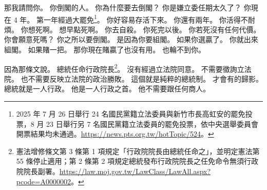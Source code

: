 \hypertarget{w01:cue:2413}{}那我請問你。
\hypertarget{w01:cue:2414}{}你倒閣的人。
\hypertarget{w01:cue:2415}{}你為什麼要去倒閣？
\hypertarget{w01:cue:2416}{}你是嫌立委任期太久了？
\hypertarget{w01:cue:2417}{}你現在 4 年。
\hypertarget{w01:cue:2418}{}第一年經過大罷免\footnote{2025 年 7 月 26 日舉行 24 名國民黨籍立法委員與新竹市長高虹安的罷免投票，8 月 23 日舉行另 7 名國民黨籍立法委員的罷免投票，依中央選舉委員會開票結果均未通過。\url{https://news.pts.org.tw/hotTopic/524}。}。
\hypertarget{w01:cue:2419}{}你好容易存活下來。
\hypertarget{w01:cue:2420}{}你還有兩年。
\hypertarget{w01:cue:2421}{}你活得不耐煩。
\hypertarget{w01:cue:2422}{}你想死啊。
\hypertarget{w01:cue:2423}{}想早點死啊。
\hypertarget{w01:cue:2424}{}你去自殺。
\hypertarget{w01:cue:2425}{}你死完以後。
\hypertarget{w01:cue:2426}{}你若死沒有任何代價。
\hypertarget{w01:cue:2427}{}你會願意死嗎？
\hypertarget{w01:cue:2428}{}你之所以要倒閣。
\hypertarget{w01:cue:2429}{}是因為你要組閣。
\hypertarget{w01:cue:2430}{}如果你選贏了。
\hypertarget{w01:cue:2431}{}你就出來組閣。
\hypertarget{w01:cue:2432}{}如果賭一把。
\hypertarget{w01:cue:2433}{}那你現在賭贏了也沒有用。
\hypertarget{w01:cue:2434}{}也輪不到你。

\hypertarget{w01:cue:2435}{}因為那條文說。
\hypertarget{w01:cue:2436}{}總統任命行政院長\footnote{憲法增修條文第 3 條第 1 項規定「行政院院長由總統任命之」，並明定憲法第 55 條停止適用；第 2 條第 2 項規定總統發布行政院院長之任免命令無須行政院院長副署。\url{https://law.moj.gov.tw/LawClass/LawAll.aspx?pcode=A0000002}。}。
\hypertarget{w01:cue:2437}{}沒有經過立法院同意。
\hypertarget{w01:cue:2438}{}不需要徵詢立法院。
\hypertarget{w01:cue:2439}{}也不需要反映立法院的政治勝敗。
\hypertarget{w01:cue:2440}{}這個就是純粹的總統制。
\hypertarget{w01:cue:2441}{}才會有的歸影。
\hypertarget{w01:cue:2442}{}總統就是一人行政。
\hypertarget{w01:cue:2443}{}他是一人行政之首。
\hypertarget{w01:cue:2444}{}他不需要跟任何商人。

